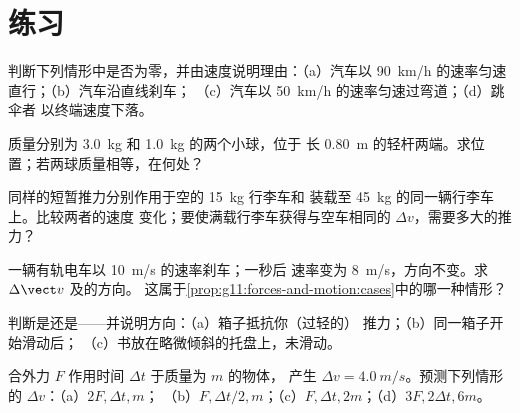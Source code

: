 \section{练习}

\begin{exercise}[$\star$]\label{exo:g11:forces-and-motion:1}
判断下列情形中是否为零，并由速度说明理由：（a）汽车以
\qty{90}{km/h} 的速率匀速直行；（b）汽车沿直线刹车；
（c）汽车以 \qty{50}{km/h} 的速率匀速过弯道；（d）跳伞者
以终端速度下落。
\end{exercise}

\begin{exercise}[$\star$]\label{exo:g11:forces-and-motion:2}
质量分别为 \qty{3.0}{kg} 和 \qty{1.0}{kg} 的两个小球，位于
长 \qty{0.80}{m} 的轻杆两端。求位置；若两球质量相等，在何处？
\end{exercise}

\begin{exercise}[$\star$]\label{exo:g11:forces-and-motion:3}
同样的短暂推力分别作用于空的 \qty{15}{kg} 行李车和
装载至 \qty{45}{kg} 的同一辆行李车上。比较两者的速度
变化；要使满载行李车获得与空车相同的 $\Delta v$，需要多大的推力？
\end{exercise}

\begin{exercise}[$\star$]\label{exo:g11:forces-and-motion:4}
一辆有轨电车以 \qty{10}{m/s} 的速率刹车；一秒后
速率变为 \qty{8}{m/s}，方向不变。求 $\Delta \vect v$ 及的方向。
这属于\cref{prop:g11:forces-and-motion:cases}中的哪一种情形？
\end{exercise}

\begin{exercise}[$\star$]\label{exo:g11:forces-and-motion:5}
判断是还是——并说明方向：（a）箱子抵抗你（过轻的）
推力；（b）同一箱子开始滑动后；
（c）书放在略微倾斜的托盘上，未滑动。
\end{exercise}

\begin{exercise}[$\star\star$]\label{exo:g11:forces-and-motion:6}
合外力 $F$ 作用时间 $\Delta t$ 于质量为 $m$ 的物体，
产生 $\Delta v = \qty{4.0}{m/s}$。预测下列情形的 $\Delta v$：（a）$2F, \Delta t, m$；
（b）$F, \Delta t/2, m$；（c）$F, \Delta t, 2m$；（d）$3F, 2\Delta t, 6m$。
\end{exercise}

